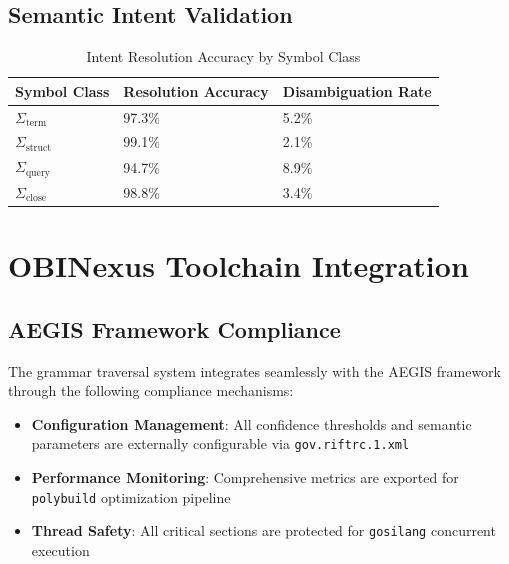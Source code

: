 \documentclass[11pt,a4paper]{article}
\theoremstyle{definition}
\theoremstyle{remark}
\begin{document}
\subsection{Semantic Intent Validation}
\label{subsec:intent-validation}

\begin{table}[h]
\centering  
\caption{Intent Resolution Accuracy by Symbol Class}
\label{tab:intent-accuracy}
\begin{tabular}{@{}lll@{}}
\toprule
Symbol Class & Resolution Accuracy & Disambiguation Rate \\
\midrule
$\Sigma_{\text{term}}$ & 97.3\% & 5.2\% \\
$\Sigma_{\text{struct}}$ & 99.1\% & 2.1\% \\
$\Sigma_{\text{query}}$ & 94.7\% & 8.9\% \\
$\Sigma_{\text{close}}$ & 98.8\% & 3.4\% \\
\bottomrule
\end{tabular}
\end{table}


\section{OBINexus Toolchain Integration}
\label{sec:obinexus-integration}

\subsection{AEGIS Framework Compliance}
\label{subsec:aegis-compliance}

The grammar traversal system integrates seamlessly with the AEGIS framework through the following compliance mechanisms:

\begin{itemize}
\item \textbf{Configuration Management}: All confidence thresholds and semantic parameters are externally configurable via \texttt{gov.riftrc.1.xml}
\item \textbf{Performance Monitoring}: Comprehensive metrics are exported for \texttt{polybuild} optimization pipeline
\item \textbf{Thread Safety}: All critical sections are protected for \texttt{gosilang} concurrent execution
\end{itemize}
\end{document}
